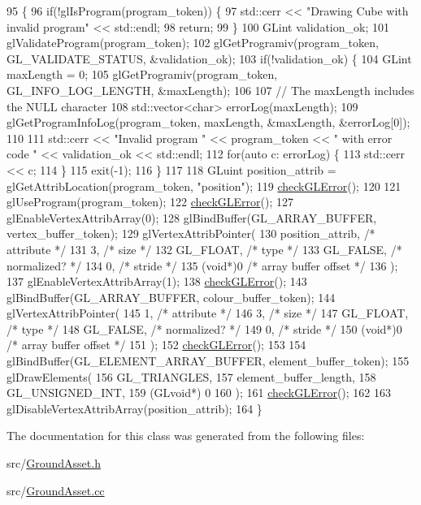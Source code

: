 \begin{DoxyCode}
95                                            \{
96   \textcolor{keywordflow}{if}(!glIsProgram(program\_token)) \{
97     std::cerr << \textcolor{stringliteral}{"Drawing Cube with invalid program"} << std::endl;
98     \textcolor{keywordflow}{return};
99   \}
100   GLint validation\_ok;
101   glValidateProgram(program\_token);
102   glGetProgramiv(program\_token, GL\_VALIDATE\_STATUS, &validation\_ok);
103   \textcolor{keywordflow}{if}(!validation\_ok) \{
104     GLint maxLength = 0;
105     glGetProgramiv(program\_token, GL\_INFO\_LOG\_LENGTH, &maxLength);
106 
107     \textcolor{comment}{// The maxLength includes the NULL character}
108     std::vector<char> errorLog(maxLength);
109     glGetProgramInfoLog(program\_token, maxLength, &maxLength, &errorLog[0]);
110 
111     std::cerr << \textcolor{stringliteral}{"Invalid program "} << program\_token << \textcolor{stringliteral}{" with error code "} << validation\_ok << std::endl;
112     \textcolor{keywordflow}{for}(\textcolor{keyword}{auto} c: errorLog) \{
113       std::cerr << c;
114     \}
115     exit(-1);
116   \}
117 
118   GLuint position\_attrib = glGetAttribLocation(program\_token, \textcolor{stringliteral}{"position"});
119   \hyperlink{GroundAsset_8cc_a75f201b0e53e68726854997957322b8d}{checkGLError}();
120 
121   glUseProgram(program\_token);
122   \hyperlink{GroundAsset_8cc_a75f201b0e53e68726854997957322b8d}{checkGLError}();
127   glEnableVertexAttribArray(0);
128   glBindBuffer(GL\_ARRAY\_BUFFER, vertex\_buffer\_token);
129   glVertexAttribPointer(
130     position\_attrib,        \textcolor{comment}{/* attribute */}
131     3,        \textcolor{comment}{/* size */}
132     GL\_FLOAT,   \textcolor{comment}{/* type */}
133     GL\_FALSE,   \textcolor{comment}{/* normalized? */}
134     0,        \textcolor{comment}{/* stride */}
135     (\textcolor{keywordtype}{void}*)0    \textcolor{comment}{/* array buffer offset */}
136   );
137   glEnableVertexAttribArray(1);
138   \hyperlink{GroundAsset_8cc_a75f201b0e53e68726854997957322b8d}{checkGLError}();
143   glBindBuffer(GL\_ARRAY\_BUFFER, colour\_buffer\_token);
144   glVertexAttribPointer(
145     1,        \textcolor{comment}{/* attribute */}
146     3,        \textcolor{comment}{/* size */}
147     GL\_FLOAT,   \textcolor{comment}{/* type */}
148     GL\_FALSE,   \textcolor{comment}{/* normalized? */}
149     0,        \textcolor{comment}{/* stride */}
150     (\textcolor{keywordtype}{void}*)0    \textcolor{comment}{/* array buffer offset */}
151   );
152   \hyperlink{GroundAsset_8cc_a75f201b0e53e68726854997957322b8d}{checkGLError}();
153 
154   glBindBuffer(GL\_ELEMENT\_ARRAY\_BUFFER, element\_buffer\_token);
155   glDrawElements(
156     GL\_TRIANGLES,
157     element\_buffer\_length,
158     GL\_UNSIGNED\_INT,
159     (GLvoid*) 0
160   );
161   \hyperlink{GroundAsset_8cc_a75f201b0e53e68726854997957322b8d}{checkGLError}();
162 
163   glDisableVertexAttribArray(position\_attrib);
164 \}
\end{DoxyCode}


The documentation for this class was generated from the following files\+:\begin{DoxyCompactItemize}
\item 
src/\hyperlink{GroundAsset_8h}{Ground\+Asset.\+h}\item 
src/\hyperlink{GroundAsset_8cc}{Ground\+Asset.\+cc}\end{DoxyCompactItemize}
